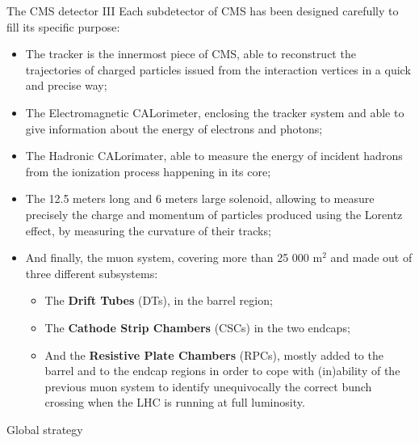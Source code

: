 \documentclass[8pt]{beamer}
\begin{document}
\begin{frame}{The CMS detector III}
\justifying
Each subdetector of CMS has been designed carefully to fill its specific purpose:

\begin{itemize}
\justifying
\item The \alert{tracker} is the innermost piece of CMS, able to reconstruct the trajectories of charged particles issued from the interaction vertices in a quick and precise way;
\item The \alert{Electromagnetic CALorimeter}, enclosing the tracker system and able to give information about the energy of electrons and photons;
\item The \alert{Hadronic CALorimater}, able to measure the energy of incident hadrons from the ionization process happening in its core;
\item The 12.5 meters long and 6 meters large \alert{solenoid}, allowing to measure precisely the charge and momentum of particles produced using the Lorentz effect, by measuring the curvature of their tracks;
\item And finally, the \alert{muon system}, covering more than 25 000 m$^2$ and made out of three different subsystems:

\begin{itemize}
\justifying
\item The \textbf{Drift Tubes} (DTs), in the barrel region;%
\item The \textbf{Cathode Strip Chambers} (CSCs) in the two endcaps;%
\item And the \textbf{Resistive Plate Chambers} (RPCs), mostly added to the barrel and to the endcap regions in order to cope with (in)ability of  the previous muon system to identify unequivocally the correct bunch crossing when the LHC is running at full luminosity.
\end{itemize}

\end{itemize}
\end{frame}













\begin{frame}[standout]
Global strategy
\end{frame}
\end{document}
